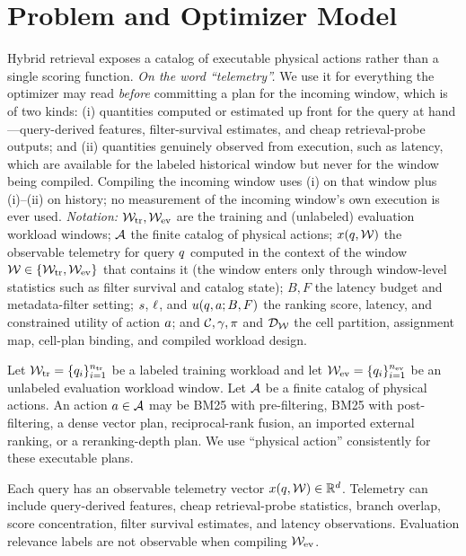 \section{Problem and Optimizer Model}
\label{sec:problem}

Hybrid retrieval exposes a catalog of executable physical actions rather than a single scoring function. \emph{On the word ``telemetry''.} We use it for everything the optimizer may read \emph{before} committing a plan for the incoming window, which is of two kinds: (i) quantities computed or estimated up front for the query at hand---query-derived features, filter-survival estimates, and cheap retrieval-probe outputs; and (ii) quantities genuinely observed from execution, such as latency, which are available for the labeled historical window but never for the window being compiled. Compiling the incoming window uses (i) on that window plus (i)--(ii) on history; no measurement of the incoming window's own execution is ever used. \emph{Notation:} $\mathcal{W}_{\mathrm{tr}},\mathcal{W}_{\mathrm{ev}}$ are the training and (unlabeled) evaluation workload windows; $\mathcal{A}$ the finite catalog of physical actions; $x(q,\mathcal{W})$ the observable telemetry for query $q$ computed in the context of the window $\mathcal{W}\in\{\mathcal{W}_{\mathrm{tr}},\mathcal{W}_{\mathrm{ev}}\}$ that contains it (the window enters only through window-level statistics such as filter survival and catalog state); $B,F$ the latency budget and metadata-filter setting; $s$, $\ell$, and $u(q,a;B,F)$ the ranking score, latency, and constrained utility of action $a$; and $\mathcal{C},\gamma,\pi$ and $\mathcal{D}_{\mathcal{W}}$ the cell partition, assignment map, cell-plan binding, and compiled workload design.

Let $\mathcal{W}_{\mathrm{tr}}=\{q_i\}_{i=1}^{n_{\mathrm{tr}}}$ be a labeled training workload and let $\mathcal{W}_{\mathrm{ev}}=\{q_i\}_{i=1}^{n_{\mathrm{ev}}}$ be an unlabeled evaluation workload window. Let $\mathcal{A}$ be a finite catalog of physical actions. An action $a\in\mathcal{A}$ may be BM25 with pre-filtering, BM25 with post-filtering, a dense vector plan, reciprocal-rank fusion, an imported external ranking, or a reranking-depth plan. We use ``physical action'' consistently for these executable plans.

Each query has an observable telemetry vector $x(q,\mathcal{W})\in\mathbb{R}^d$. Telemetry can include query-derived features, cheap retrieval-probe statistics, branch overlap, score concentration, filter survival estimates, and latency observations. Evaluation relevance labels are not observable when compiling $\mathcal{W}_{\mathrm{ev}}$.

